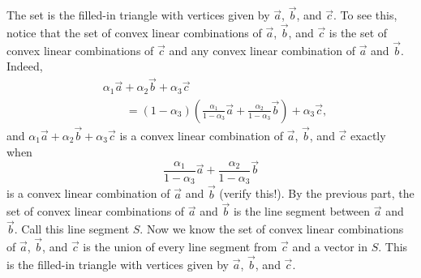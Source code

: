 \begin{exercises}
\begin{problist}
\begin{solution}
\begin{enumerate}
				The set is the filled-in
				triangle with vertices given by $\vec a$,
				$\vec b$, and $\vec c$. To see this, notice
				that the set of convex linear combinations of
				$\vec a$, $\vec b$, and $\vec c$ is the set of
				convex linear combinations of $\vec c$ and any
				convex linear combination of $\vec a$ and
				$\vec b$. Indeed,
				\[
					\begin{split}
						&\alpha_{1} \vec a+\alpha_{2} \vec b+ \alpha_{3}
						\vec c \\
						&\qquad= (1-\alpha_{3})\left(\tfrac{\alpha_1}{1-\alpha_3}\vec
						a + \tfrac{\alpha_2}{1-\alpha_3}\vec b\right)+\alpha_{3}
						\vec c,
					\end{split}
				\]
				and $\alpha_{1} \vec a+\alpha_{2} \vec b+ \alpha_{3}
				\vec c$ is a convex linear combination of $\vec
				a$, $\vec b$, and $\vec c$ exactly when
				\[
					\frac{\alpha_1}{1-\alpha_3}\vec a + \frac{\alpha_2}{1-\alpha_3}\vec b
				\]
				 is a convex linear combination of $\vec a$ and $\vec
				b$ (verify this!).
					By the previous part, the set of convex linear combinations
				of $\vec a$ and $\vec b$ is the line segment
				between $\vec a$ and $\vec b$. Call this line segment $S$.
				Now we know the set of convex linear
				combinations of $\vec a$, $\vec b$, and $\vec c$
				is the union of every line segment from $\vec c$
				and a vector in $S$. This is the filled-in triangle with
				vertices given by $\vec a$, $\vec b$, and $\vec	c$.
			\end{enumerate}
		\end{solution}


\end{problist}
\end{exercises}
